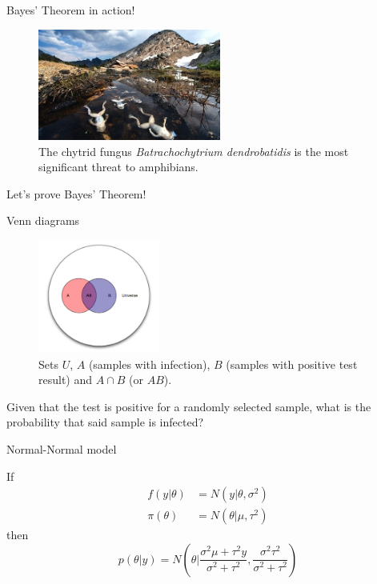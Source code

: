 \begin{frame}{Bayes' Theorem in action!}

	\begin{figure}[!ht]
		\centering
		\includegraphics[width=6cm]{Images/Frogs.jpg}
		\caption{The chytrid fungus \textit{Batrachochytrium dendrobatidis} is the most 
		significant threat to amphibians.}
		\label{Fig:Frogs}
	\end{figure}

	Let's prove Bayes' Theorem!

\end{frame}

\begin{frame}{Venn diagrams}

	\begin{figure}[!ht]
		\centering
		\includegraphics[width=4cm]{Images/Set3.png}
		\caption{Sets $U$, $A$ (samples with infection), $B$ (samples with positive test 
		result) and $A \cap B$ (or $AB$).}
		\label{Fig:Set3}
	\end{figure}

	Given that the test is positive for a randomly selected sample, what is the probability 
	that said sample is infected?

\end{frame}

\begin{frame}{Normal-Normal model}

	\begin{block}{}
		If
		\begin{align}
			f(y|\theta) &= N(y|\theta, \sigma^2)\\
			\pi(\theta) &= N(\theta|\mu, \tau^2)
		\end{align}
		then
		\begin{equation}
			p(\theta|y) = N(\theta|\frac{\sigma^2\mu+\tau^2y}{\sigma^2+\tau^2},\frac{\sigma^2\tau^2}{\sigma^2 + \tau^2})
		\end{equation}
	\end{block} 

\end{frame}

